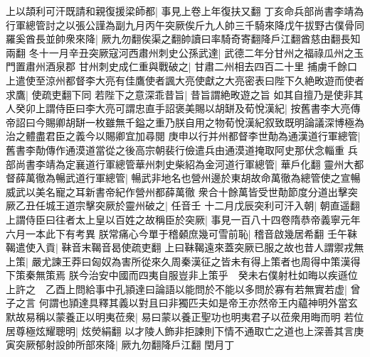 上以頡利可汗既請和親復援梁師都|{
	事見上卷上年復扶又翻}
丁亥命兵部尚書李靖為行軍總管討之以張公謹為副九月丙午突厥俟斤九人帥三千騎來降戊午拔野古僕骨同羅奚酋長並帥衆來降|{
	厥九勿翻俟渠之翻帥讀曰率騎奇寄翻降戶江翻酋慈由翻長知兩翻}
冬十一月辛丑突厥寇河西肅州刺史公孫武達|{
	武德二年分甘州之福祿瓜州之玉門置肅州酒泉郡}
甘州刺史成仁重與戰破之|{
	甘肅二州相去四百二十里}
捕虜千餘口　上遣使至涼州都督李大亮有佳鷹使者諷大亮使獻之大亮密表曰陛下久絶畋遊而使者求鷹|{
	使疏吏翻下同}
若陛下之意深乖昔旨|{
	昔旨謂絶畋遊之旨}
如其自擅乃是使非其人癸卯上謂侍臣曰李大亮可謂忠直手詔褒美賜以胡缾及荀悅漢紀|{
	按舊書李大亮傳帝詔曰今賜卿胡缾一枚雖無千鎰之重乃朕自用之物荀悅漢紀叙致既明論議深博極為治之體盡君臣之義今以賜卿宜加尋閱}
庚申以行并州都督李世勣為通漢道行軍總管|{
	舊書李勣傳作通漠道當從之後高宗朝裴行儉遣兵由通漠道掩取阿史那伏念輜重}
兵部尚書李靖為定襄道行軍總管華州刺史柴紹為金河道行軍總管|{
	華戶化翻}
靈州大都督薛萬徹為暢武道行軍總管|{
	暢武非地名也營州邊於東胡故命萬徹為總管使之宣暢威武以美名寵之耳新書帝紀作營州都薛萬徹}
衆合十餘萬皆受世勣節度分道出擊突厥乙丑任城王道宗擊突厥於靈州破之|{
	任音壬}
十二月戊辰突利可汗入朝|{
	朝直遥翻}
上謂侍臣曰往者太上皇以百姓之故稱臣於突厥|{
	事見一百八十四卷隋恭帝義寧元年六月一本此下有考異}
朕常痛心今單于稽顙庶幾可雪前恥|{
	稽音啟幾居希翻}
壬午靺鞨遣使入貢|{
	靺音末鞨音曷使疏吏翻}
上曰靺鞨遠來蓋突厥已服之故也昔人謂禦戎無上策|{
	嚴尤諫王莽曰匈奴為害所從來久周秦漢征之皆未有得上策者也周得中策漢得下策秦無策焉}
朕今治安中國而四夷自服豈非上策乎　癸未右僕射杜如晦以疾遜位上許之　乙酉上問給事中孔頴達曰論語以能問於不能以多問於寡有若無實若虚|{
	曾子之言}
何謂也頴達具釋其義以對且曰非獨匹夫如是帝王亦然帝王内藴神明外當玄默故易稱以蒙養正以明夷莅衆|{
	易曰蒙以養正聖功也明夷君子以莅衆用晦而明}
若位居尊極炫耀聰明|{
	炫熒絹翻}
以才陵人飾非拒諫則下情不通取亡之道也上深善其言庚寅突厥郁射設帥所部來降|{
	厥九勿翻降戶江翻}
閏月丁

